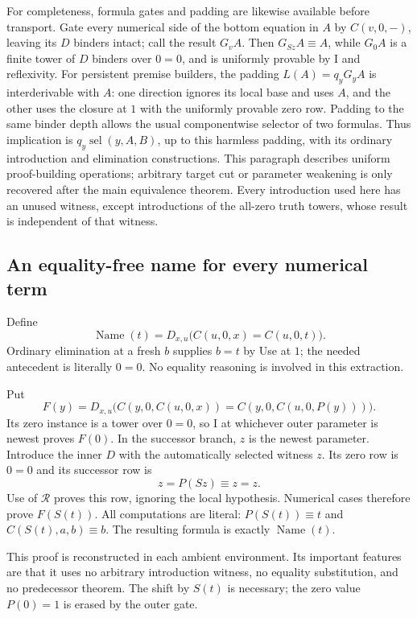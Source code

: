 \documentclass[11pt]{article}
\theoremstyle{definition}\newtheorem{definition}[theorem]{Definition}
\theoremstyle{remark}\newtheorem{remark}[theorem]{Remark}
\begin{document}
For completeness, formula gates and padding are likewise available before
transport.  Gate every numerical side of the bottom equation in $A$ by
$C(v,0,-)$, leaving its $D$ binders intact; call the result $G_vA$.
Then $G_{Sz}A\equiv A$, while $G_0A$ is a finite tower of $D$ binders
over $0=0$, and is uniformly provable by I and reflexivity.
For persistent premise builders, the padding $L(A)=q_yG_yA$ is
interderivable with $A$: one direction
ignores its local base and uses $A$, and the other uses the closure at
$1$ with the uniformly provable zero row.  Padding to the same binder
depth allows the usual componentwise selector of two formulas.  Thus
implication is $q_y\operatorname{sel}(y,A,B)$, up to this harmless
padding, with its ordinary introduction and elimination constructions.
This paragraph describes uniform proof-building operations; arbitrary
target cut or parameter weakening is only recovered after the main
equivalence theorem. Every introduction used here has an unused witness,
except introductions
of the all-zero truth towers, whose result is independent of that witness.

\subsection{An equality-free name for every numerical term}

Define
\[
 \operatorname{Name}(t)
   =D_{x,u}\bigl(C(u,0,x)=C(u,0,t)\bigr).
\]
Ordinary elimination at a fresh $b$ supplies $b=t$ by Use at $1$;
the needed antecedent is literally $0=0$.  No equality reasoning is
involved in this extraction.

Put
\[
 F(y)=D_{x,u}\bigl(
 C(y,0,C(u,0,x))=C(y,0,C(u,0,P(y)))\bigr).
\]
Its zero instance is a tower over $0=0$, so I at whichever outer
parameter is newest proves $F(0)$.  In the successor branch, $z$ is
the newest parameter.  Introduce the inner $D$ with the automatically
selected witness $z$.  Its zero row is $0=0$ and its successor row is
\[
                         z=P(Sz)\equiv z=z.
\]
Use of $\mathcal R$ proves this row, ignoring the local hypothesis.
Numerical cases therefore prove $F(S(t))$.  All computations are
literal: $P(S(t))\equiv t$ and $C(S(t),a,b)\equiv b$.  The resulting
formula is exactly $\operatorname{Name}(t)$.

This proof is reconstructed in each ambient environment.  Its important
features are that it uses no arbitrary introduction witness, no equality
substitution, and no predecessor theorem.  The shift by $S(t)$ is necessary;
the zero value $P(0)=1$ is erased by the outer gate.
\end{document}
